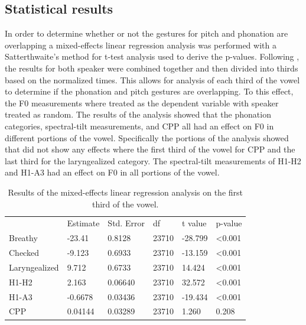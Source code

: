 \documentclass[12pt, letterpaper]{article}
\providecommand{\lsptoprule}{\midrule\toprule}
\providecommand{\lspbottomrule}{\bottomrule\midrule}
\begin{document}
\subsection{Statistical results} \label{sec:Stats}
In order to determine whether or not the gestures for pitch and phonation are overlapping a mixed-effects linear regression analysis was performed with a Satterthwaite's method for t-test analysis used to derive the p-values. Following \citet{garellekAcousticConsequencesPhonation2011}, the results for both speaker were combined together and then divided into thirds based on the normalized times. This allows for analysis of each third of the vowel to determine if the phonation and pitch gestures are overlapping. To this effect, the F0 measurements where treated as the dependent variable with speaker treated as random. The results of the analysis showed that the phonation categories, spectral-tilt measurements, and CPP all had an effect on F0 in different portions of the vowel. Specifically the portions of the analysis showed that did not show any effects where the first third of the vowel for CPP and the last third for the laryngealized category. The spectral-tilt measurements of H1-H2 and H1-A3 had an effect on F0 in all portions of the vowel. 

\begin{table}[!h]
	\centering
	\caption{Results of the mixed-effects linear regression analysis on the first third of the vowel. }
	\label{tab:tones}
	 \begin{tabular}{llllll}
	  \lsptoprule
						&  Estimate  & Std. Error & df & t value & p-value \\
	  	Breathy   		&  -23.41  	&  0.8128	& 23710 & -28.799 	& <0.001\\
		Checked    		&  -9.123  	&  0.6933	& 23710 & -13.159 	& <0.001 \\
		Laryngealized	& 9.712		& 0.6733	& 23710	& 14.424 	& <0.001 \\
		H1-H2			& 2.163		& 0.06640	& 23710	& 32.572 	& <0.001\\
		H1-A3			& -0.6678 	& 0.03436	& 23710	& -19.434	& <0.001\\
		CPP				& 0.04144	& 0.03289	& 23710	& 1.260		& 0.208\\
	  \lspbottomrule
	 \end{tabular}
\end{table}
\end{document}
